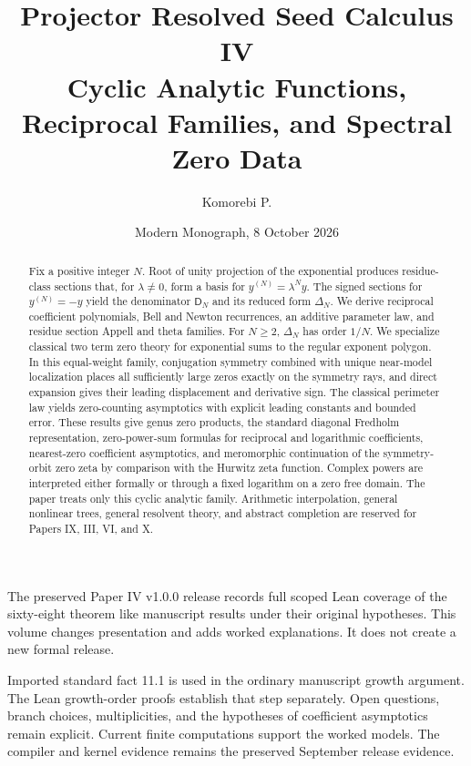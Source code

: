 \documentclass[11pt,letterpaper]{article}
\title{\textbf{Projector Resolved Seed Calculus IV}\\[0.45em]
\large Cyclic Analytic Functions, Reciprocal Families, and Spectral Zero Data}
\author{Komorebi P.}
\date{Modern Monograph, 8 October 2026}
\theoremstyle{definition}
\theoremstyle{remark}
\newcommand{\Dfun}{\mathsf D}
\begin{document}
\KomorebiCover
{}

\begin{abstract}
Fix a positive integer $N$. Root of unity projection of the exponential
produces residue-class sections that, for $\lambda\ne0$, form a basis for
$y^{(N)}=\lambda^N y$. The signed sections for $y^{(N)}=-y$ yield the
denominator $\Dfun_N$ and its reduced form $\Delta_N$. We derive reciprocal
coefficient polynomials, Bell and Newton recurrences, an additive parameter
law, and residue section Appell and theta families. For $N\geq2$,
$\Delta_N$ has order $1/N$. We specialize classical two term zero theory for
exponential sums to the regular exponent polygon. In this equal-weight family,
conjugation symmetry combined with unique near-model localization places all
sufficiently large zeros exactly on the symmetry rays, and direct expansion
gives their leading displacement and derivative sign. The classical perimeter
law yields zero-counting asymptotics with explicit leading constants and
bounded error. These results give genus zero products, the standard diagonal
Fredholm representation, zero-power-sum formulas for reciprocal and
logarithmic coefficients, nearest-zero coefficient asymptotics, and
meromorphic continuation of the symmetry-orbit zero zeta by comparison with
the Hurwitz zeta function. Complex powers are interpreted either formally or
through a fixed logarithm on a zero free domain. The paper treats only this
cyclic analytic family. Arithmetic interpolation, general nonlinear trees,
general resolvent theory, and abstract completion are reserved for Papers IX,
III, VI, and X.
\end{abstract}

\begin{readerroadmap}[title={Formal scope and evidence}]
The preserved Paper IV v1.0.0 release records full scoped Lean coverage of the sixty-eight theorem like manuscript results under their original hypotheses. This volume changes presentation and adds worked explanations. It does not create a new formal release.

Imported standard fact 11.1 is used in the ordinary manuscript growth argument. The Lean growth-order proofs establish that step separately. Open questions, branch choices, multiplicities, and the hypotheses of coefficient asymptotics remain explicit. Current finite computations support the worked models. The compiler and kernel evidence remains the preserved September release evidence.
\end{readerroadmap}
\end{document}
